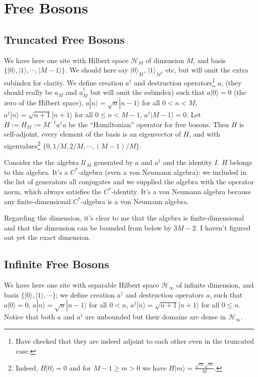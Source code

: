 \section{Free Bosons}
	\subsection{Truncated Free Bosons}
	We have here one site with Hilbert space $\mathcal{H}_M$ of dimension $M$,  and basis $\{|0\rangle, |1\rangle, \cdots, |M-1\rangle\}$.
	We should here say $|0\rangle_M$, $|1\rangle_M$, etc, but will omit the extra subindex for clarity.
	We define creation $a^\dagger$ and destruction operators\footnote{Have checked that they are indeed adjoint to each other even in the truncated case.} $a$, (they should really be $a_M$ and $a^\dagger_M$ but will omit the subindex)
	such that $a|0\rangle=0$ (the zero of the Hilbert space), $a|n\rangle=\sqrt{n}|n-1\rangle$ for all $0<n<M$, 
	$a^\dagger|n\rangle=\sqrt{n+1}|n+1\rangle$ for all $0\le n < M - 1$, $a^\dagger|M-1\rangle=0$.
	Let $H:=H_M:=M^{-1}a^\dagger a$ be the ``Hamiltonian'' operator for free bosons.
	Then $H$ is self-adjoint, every element of the basis is an eigenvector of $H$, and with eigenvalues\footnote{Indeed, $H|0\rangle = 0$ and for $M-1 \geq m > 0$ we have $H|m \rangle = \frac{\sqrt{m}\sqrt{m}}{M}$. } $\{0, 1/M, 2/M, \cdots, (M-1)/M\}$.
	
	Consider the the algebra $\mathcal{U}_M$ generated by $a$ and $a^\dagger$ and the identity $I$. $H$ belongs to this algebra. It's a $C^*$-algebra (even a von Neumann algebra): we included in the list of generators all conjugates and we supplied the algebra with the operator norm, which always satisfies the $C^*$-identity. It's a von Neumann algebra because any finite-dimensional $C^*$-algebra is a von Neumann algebra.
	
Regarding the dimension, it's clear to me that the algebra is finite-dimensional and that the dimension can be bounded from below by $3M-2$. I haven't figured out yet the exact dimension.

	\subsection{Infinite Free Bosons}
		We have here  one site with separable Hilbert space $\mathcal{H}_\infty$ of infinite dimension,  and basis $\{|0\rangle, |1\rangle, \cdots\}$; 
	we define creation $a^\dagger$ and destruction operators $a$,
	such that $a|0\rangle=0$, $a|n\rangle=\sqrt{n}|n-1\rangle$ for all $0<n$, 
	$a^\dagger|n\rangle=\sqrt{n+1}|n+1\rangle$ for all $0\le n$. Notice that both $a$ and $a^\dagger$ are unbounded but their domains are dense in $\mathcal H_{\infty}$.
	
